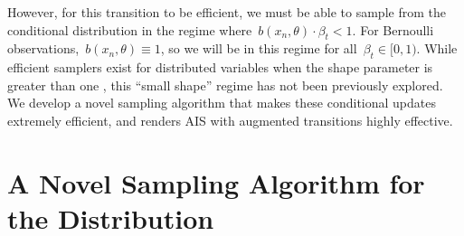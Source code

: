 However, for this transition to be efficient, 
we must be able to sample from the \polyagamma 
conditional distribution in the regime where~${b(x_n, \theta) \cdot \beta_t < 1}$.
For Bernoulli observations,~${b(x_n, \theta) \equiv 1}$, so we
will be in this regime for all~$\beta_t \in [0,1)$.
While efficient samplers exist for \polyagamma distributed variables 
when the shape parameter is greater than one \citep{windle2014sampling}, 
this ``small shape'' regime has not been previously explored.
We develop a novel sampling algorithm that makes these 
conditional updates extremely efficient, and renders AIS with 
\polyagamma augmented transitions highly effective.

\section{A Novel Sampling Algorithm for the \polyagamma Distribution}
\label{sec:pgsampling}

